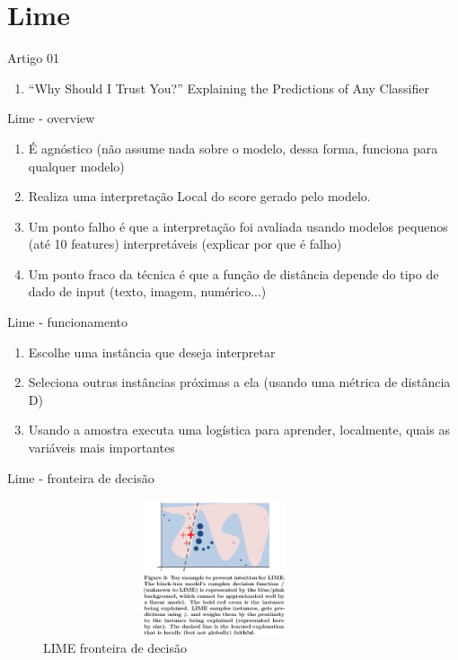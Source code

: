 \section{Lime}

\begin{frame}
	\begin{block}{Artigo 01}
	\begin{enumerate}
		\item ``Why Should I Trust You?'' Explaining the Predictions of Any Classifier
	\end{enumerate}
	\end{block}
\end{frame}


\begin{frame}
	\begin{block}{Lime - overview}
	\begin{enumerate}
		\item É agnóstico (não assume nada sobre o modelo, dessa forma, funciona para qualquer modelo)
		\item Realiza uma interpretação Local do score gerado pelo modelo.
		\item Um ponto falho é que a interpretação foi avaliada usando modelos pequenos (até 10 features) interpretáveis (explicar por que é falho) 
		\item Um ponto fraco da técnica é que a função de distância depende do tipo de dado de input (texto, imagem, numérico...)
	\end{enumerate}
	\end{block}
\end{frame}


\begin{frame}
	\begin{block}{Lime - funcionamento}
		\begin{enumerate}
			\item Escolhe uma instância que deseja interpretar
			\item Seleciona outras instâncias próximas a ela (usando uma métrica de distância D)
			\item Usando a amostra executa uma logística para aprender, localmente, quais as variáveis mais importantes
		\end{enumerate}
	\end{block}
\end{frame}


\begin{frame}
	\begin{block}{Lime - fronteira de decisão}
		\begin{figure}[!htb]
			\centering	  				
			\includegraphics[height=4cm, width = 10cm]{./pic/LIMEfronteira.png}
			\caption{LIME fronteira de decisão}
			\label{fig_ds_process}
		\end{figure}	
	\end{block}
\end{frame}





